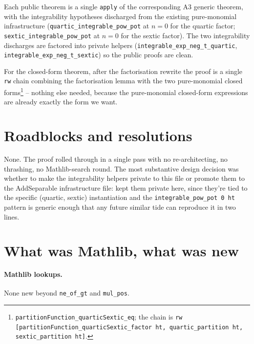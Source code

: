 \documentclass[11pt]{article}
\begin{document}
Each public theorem is a single \texttt{apply} of the corresponding
A3 generic theorem, with the integrability hypotheses discharged from
the existing pure-monomial infrastructure
(\texttt{quartic\_integrable\_pow\_pot} at $n = 0$ for the quartic
factor; \texttt{sextic\_integrable\_pow\_pot} at $n = 0$ for the
sextic factor). The two integrability discharges are factored into
private helpers
(\texttt{integrable\_exp\_neg\_t\_quartic},
\texttt{integrable\_exp\_neg\_t\_sextic}) so the public proofs are
clean.

For the closed-form theorem, after the factorisation rewrite the
proof is a single \texttt{rw} chain combining the factorisation
lemma with the two pure-monomial closed
forms\footnote{\texttt{partitionFunction\_quarticSextic\_eq};
the chain is \texttt{rw [partitionFunction\_quarticSextic\_factor
ht, quartic\_partition ht, sextic\_partition ht]}.} -- nothing
else needed, because the pure-monomial closed-form expressions are
already exactly the form we want.

\section{Roadblocks and resolutions}

None. The proof rolled through in a single pass with no
re-architecting, no thrashing, no Mathlib-search round. The most
substantive design decision was whether to make the integrability
helpers private to this file or promote them to the AddSeparable
infrastructure file: kept them private here, since they're tied to
the specific (quartic, sextic) instantiation and the
\texttt{integrable\_pow\_pot 0 ht} pattern is generic enough that any
future similar tide can reproduce it in two lines.

\section{What was Mathlib, what was new}

\paragraph{Mathlib lookups.} None new beyond \texttt{ne\_of\_gt} and
\texttt{mul\_pos}.
\end{document}
